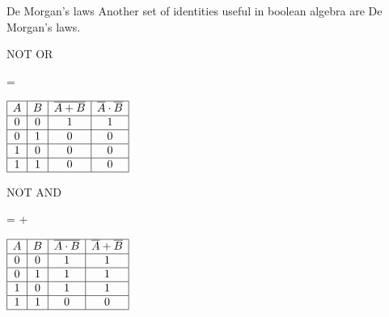 	\begin{namedframe}{De Morgan's laws}
		Another set of identities useful in boolean algebra are De Morgan's laws.
		\begin{center}
			\pause
			\begin{minipage}{0.425\textwidth}
				\centering
				\begin{block}{NOT OR}
					\begin{compactmath}
						 =  \cdot {}
					\end{compactmath}
				\end{block}
				\begin{math}
					\begin{array}{|c|c|c|c|}
						\hline
						A & B & \overline{A + B} & \overline{A} \cdot \overline{B}\\\hline
						0 & 0 &  1             &  1                         \\\hline
						0 & 1 &  0             &  0                         \\\hline
						1 & 0 &  0             &  0                         \\\hline
						1 & 1 &  0             &  0                         \\\hline
					\end{array}
				\end{math}
			\end{minipage}
			\hspace{0.025\textwidth}
			\pause
			\begin{minipage}{0.425\textwidth}
				\centering
				\begin{block}{NOT AND}
					\begin{compactmath}
						 = \negate{A} + \negate{B}
					\end{compactmath}
				\end{block}
				\begin{math}
					\begin{array}{|c|c|c|c|}
						\hline
						A & B & \negate{A \cdot B} &  + \\\hline
						0 & 0 &  1             &  1                         \\\hline
						0 & 1 &  1             &  1                         \\\hline
						1 & 0 &  1             &  1                         \\\hline
						1 & 1 &  0             &  0                         \\\hline
					\end{array}
				\end{math}
			\end{minipage}
		\end{center}
	\end{namedframe}
